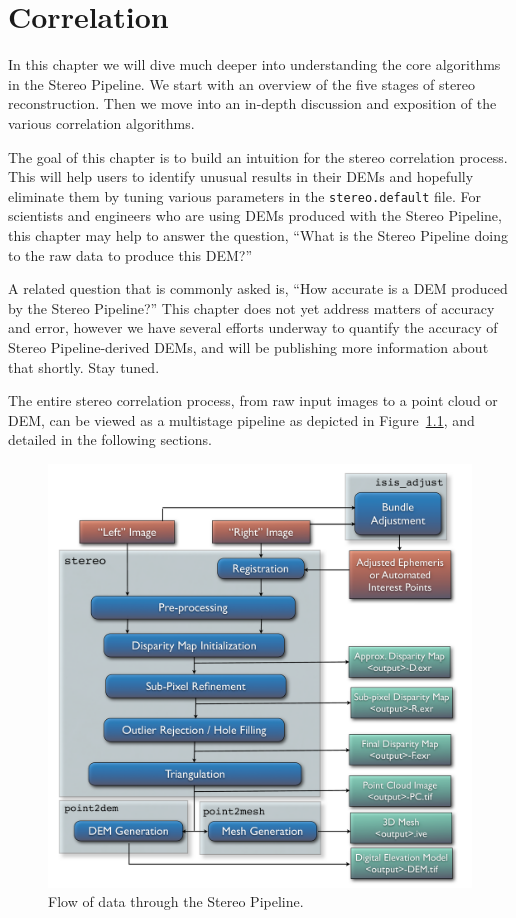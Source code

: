 \chapter{Correlation}
\label{ch:correlation}

In this chapter we will dive much deeper into understanding the core
algorithms in the Stereo Pipeline.  We start with an overview of the
five stages of stereo reconstruction.  Then we move into an in-depth
discussion and exposition of the various correlation algorithms.

The goal of this chapter is to build an intuition for the stereo
correlation process.  This will help users to identify unusual results
in their \acp{DEM} and hopefully eliminate them by tuning various
parameters in the \texttt{stereo.default} file.  For scientists and
engineers who are using \acp{DEM} produced with the Stereo Pipeline, this
chapter may help to answer the question, ``What is the Stereo Pipeline
doing to the raw data to produce this \ac{DEM}?''  

A related question that is commonly asked is, ``How accurate is a \ac{DEM}
produced by the Stereo Pipeline?''  This chapter does not yet address
matters of accuracy and error, however we have several efforts underway
to quantify the accuracy of Stereo Pipeline-derived \acp{DEM}, and will be
publishing more information about that shortly.  Stay tuned.


The entire stereo correlation process, from raw input images to a
point cloud or DEM, can be viewed as a multistage pipeline as depicted
in Figure~\ref{fig:asp}, and detailed in the following sections.

\begin{figure}[tb]
  \centering
  \includegraphics[width=13cm]{images/asp}
  \caption{Flow of data through the Stereo Pipeline.}
  \label{fig:asp}
\end{figure}

